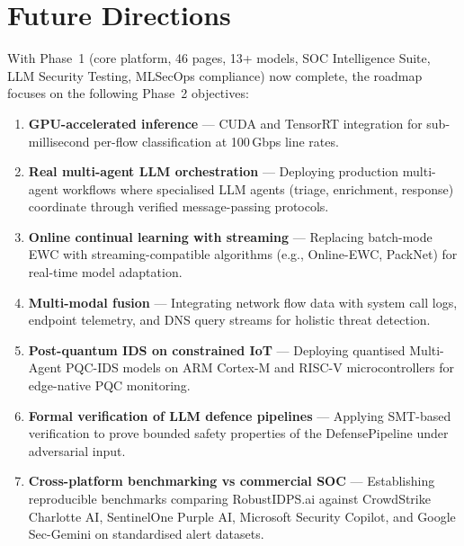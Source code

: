 \documentclass[11pt,a4paper]{article}
\begin{document}
\section{Future Directions}
\label{sec:future}

With Phase~1 (core platform, 46 pages, 13+ models, SOC Intelligence Suite,
LLM Security Testing, MLSecOps compliance) now complete, the roadmap
focuses on the following Phase~2 objectives:

\begin{enumerate}
  \item \textbf{GPU-accelerated inference} --- CUDA and TensorRT
        integration for sub-millisecond per-flow classification at
        100\,Gbps line rates.
  \item \textbf{Real multi-agent LLM orchestration} --- Deploying
        production multi-agent workflows where specialised LLM agents
        (triage, enrichment, response) coordinate through verified
        message-passing protocols.
  \item \textbf{Online continual learning with streaming} --- Replacing
        batch-mode EWC with streaming-compatible algorithms (e.g.,
        Online-EWC, PackNet) for real-time model adaptation.
  \item \textbf{Multi-modal fusion} --- Integrating network flow data
        with system call logs, endpoint telemetry, and DNS query streams
        for holistic threat detection.
  \item \textbf{Post-quantum IDS on constrained IoT} --- Deploying
        quantised Multi-Agent PQC-IDS models on ARM Cortex-M and
        RISC-V microcontrollers for edge-native PQC monitoring.
  \item \textbf{Formal verification of LLM defence pipelines} ---
        Applying SMT-based verification to prove bounded safety
        properties of the DefensePipeline under adversarial input.
  \item \textbf{Cross-platform benchmarking vs commercial SOC} ---
        Establishing reproducible benchmarks comparing RobustIDPS.ai
        against CrowdStrike Charlotte AI, SentinelOne Purple AI,
        Microsoft Security Copilot, and Google Sec-Gemini on
        standardised alert datasets.
\end{enumerate}

\end{document}
